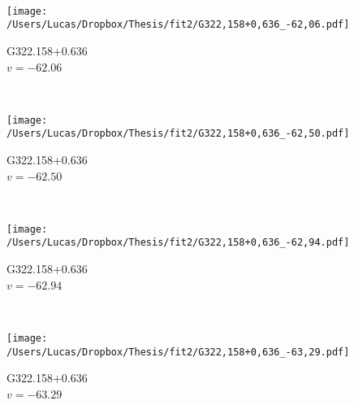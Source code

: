 \begin{figure*}[t]
\begin{subfigure}[t]{0.3\textwidth}
	\end{subfigure}
	~
	\begin{subfigure}[t]{0.3\textwidth}
		\texttt{[image: /Users/Lucas/Dropbox/Thesis/fit2/G322,158+0,636\_-62,06.pdf]}
		\caption[]{G322.158+0.636\\$v=-62.06$\,\kms}
	\end{subfigure}
	~
	\begin{subfigure}[t]{0.3\textwidth}
		\texttt{[image: /Users/Lucas/Dropbox/Thesis/fit2/G322,158+0,636\_-62,50.pdf]}
		\caption[]{G322.158+0.636\\$v=-62.50$\,\kms}
	\end{subfigure}
	~
	\begin{subfigure}[t]{0.3\textwidth}
		\texttt{[image: /Users/Lucas/Dropbox/Thesis/fit2/G322,158+0,636\_-62,94.pdf]}
		\caption[]{G322.158+0.636\\$v=-62.94$\,\kms}
	\end{subfigure}
	~
	\begin{subfigure}[t]{0.3\textwidth}
		\texttt{[image: /Users/Lucas/Dropbox/Thesis/fit2/G322,158+0,636\_-63,29.pdf]}
		\caption[]{G322.158+0.636\\$v=-63.29$\,\kms}
	\end{subfigure}
	~
\end{figure*}
\clearpage
